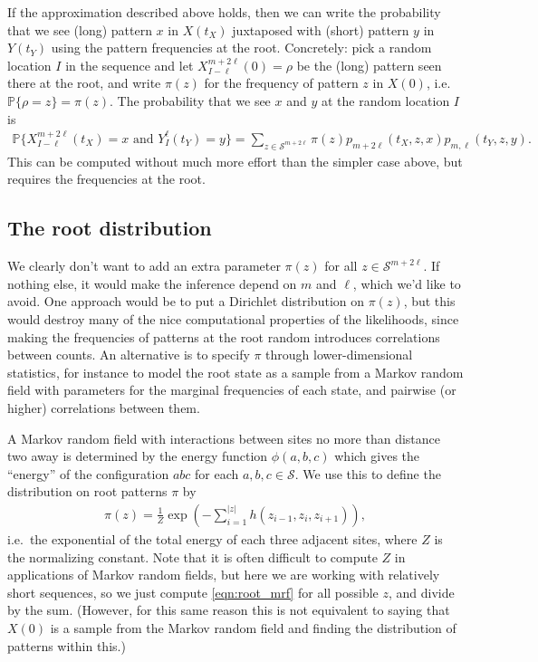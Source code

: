 \documentclass{article}
\renewcommand{\P}{\mathbb{P}}
\newcommand{\calS}{\mathcal{S}}  %
\theoremstyle{plain}
\theoremstyle{definition}
\begin{document}
If the approximation described above holds,
then we can write the probability that we see (long) pattern $x$ in $X(t_X)$ juxtaposed with (short) pattern $y$ in $Y(t_Y)$
using the pattern frequencies at the root.
Concretely: pick a random location $I$ in the sequence and let $X_{I-\ell}^{m+2\ell}(0) = \rho$ be the (long) pattern seen there at the root,
and write $\pi(z)$ for the frequency of pattern $z$ in $X(0)$, i.e.\ $\P\{\rho=z\}=\pi(z)$.
The probability that we see $x$ and $y$ at the random location $I$ is
\begin{align} \label{eqn:phylo_likelihood}
    \P\{X_{I-\ell}^{m+2\ell}(t_X)=x \text{ and } Y_I^\ell(t_Y)=y \} = \sum_{z \in \calS^{m+2\ell}} \pi(z) p_{m+2\ell}(t_X,z,x) p_{m,\ell}(t_Y,z,y) .
\end{align}
This can be computed without much more effort than the simpler case above,
but requires the frequencies at the root.

\subsection{The root distribution}

We clearly don't want to add an extra parameter $\pi(z)$ for all $z \in \calS^{m+2\ell}$. 
If nothing else, it would make the inference depend on $m$ and $\ell$, which we'd like to avoid.
One approach would be to put a Dirichlet distribution on $\pi(z)$,
but this would destroy many of the nice computational properties of the likelihoods,
since making the frequencies of patterns at the root random introduces correlations between counts.
An alternative is to specify $\pi$ through lower-dimensional statistics,
for instance to model the root state as a sample from a Markov random field
with parameters for the marginal frequencies of each state, and pairwise (or higher) correlations between them.

A Markov random field with interactions between sites no more than distance two away 
is determined by the energy function $\phi(a,b,c)$ which gives the ``energy'' of the configuration $abc$ for each $a,b,c \in \calS$.
We use this to define the distribution on root patterns $\pi$ by
\begin{align}  \label{eqn:root_mrf}
    \pi(z) = \frac{1}{Z} \exp\left( - \sum_{i=1}^{|z|} h(z_{i-1},z_i,z_{i+1}) \right),
\end{align}
i.e.\ the exponential of the total energy of each three adjacent sites,
where $Z$ is the normalizing constant.
Note that it is often difficult to compute $Z$ in applications of Markov random fields,
but here we are working with relatively short sequences, 
so we just compute \eqref{eqn:root_mrf} for all possible $z$, and divide by the sum.
(However, for this same reason this is not equivalent to saying that $X(0)$ is a sample from the Markov random field
and finding the distribution of patterns within this.)
\end{document}
